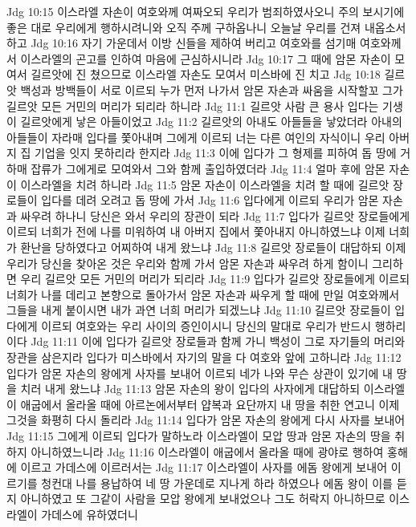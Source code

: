 Jdg 10:15  이스라엘 자손이 여호와께 여짜오되 우리가 범죄하였사오니 주의 보시기에 좋은 대로 우리에게 행하시려니와 오직 주께 구하옵나니 오늘날 우리를 건져 내옵소서 하고
Jdg 10:16  자기 가운데서 이방 신들을 제하여 버리고 여호와를 섬기매 여호와께서 이스라엘의 곤고를 인하여 마음에 근심하시니라
Jdg 10:17  그 때에 암몬 자손이 모여서 길르앗에 진 쳤으므로 이스라엘 자손도 모여서 미스바에 진 치고
Jdg 10:18  길르앗 백성과 방백들이 서로 이르되 누가 먼저 나가서 암몬 자손과 싸움을 시작할꼬 그가 길르앗 모든 거민의 머리가 되리라 하니라
Jdg 11:1  길르앗 사람 큰 용사 입다는 기생이 길르앗에게 낳은 아들이었고
Jdg 11:2  길르앗의 아내도 아들들을 낳았더라 아내의 아들들이 자라매 입다를 쫓아내며 그에게 이르되 너는 다른 여인의 자식이니 우리 아버지 집 기업을 잇지 못하리라 한지라
Jdg 11:3  이에 입다가 그 형제를 피하여 돕 땅에 거하매 잡류가 그에게로 모여와서 그와 함께 출입하였더라
Jdg 11:4  얼마 후에 암몬 자손이 이스라엘을 치려 하니라
Jdg 11:5  암몬 자손이 이스라엘을 치려 할 때에 길르앗 장로들이 입다를 데려 오려고 돕 땅에 가서
Jdg 11:6  입다에게 이르되 우리가 암몬 자손과 싸우려 하나니 당신은 와서 우리의 장관이 되라
Jdg 11:7  입다가 길르앗 장로들에게 이르되 너희가 전에 나를 미워하여 내 아버지 집에서 쫓아내지 아니하였느냐 이제 너희가 환난을 당하였다고 어찌하여 내게 왔느냐
Jdg 11:8  길르앗 장로들이 대답하되 이제 우리가 당신을 찾아온 것은 우리와 함께 가서 암몬 자손과 싸우려 하게 함이니 그리하면 우리 길르앗 모든 거민의 머리가 되리라
Jdg 11:9  입다가 길르앗 장로들에게 이르되 너희가 나를 데리고 본향으로 돌아가서 암몬 자손과 싸우게 할 때에 만일 여호와께서 그들을 내게 붙이시면 내가 과연 너희 머리가 되겠느냐
Jdg 11:10  길르앗 장로들이 입다에게 이르되 여호와는 우리 사이의 증인이시니 당신의 말대로 우리가 반드시 행하리이다
Jdg 11:11  이에 입다가 길르앗 장로들과 함께 가니 백성이 그로 자기들의 머리와 장관을 삼은지라 입다가 미스바에서 자기의 말을 다 여호와 앞에 고하니라
Jdg 11:12  입다가 암몬 자손의 왕에게 사자를 보내어 이르되 네가 나와 무슨 상관이 있기에 내 땅을 치러 내게 왔느냐
Jdg 11:13  암몬 자손의 왕이 입다의 사자에게 대답하되 이스라엘이 애굽에서 올라올 때에 아르논에서부터 얍복과 요단까지 내 땅을 취한 연고니 이제 그것을 화평히 다시 돌리라
Jdg 11:14  입다가 암몬 자손의 왕에게 다시 사자를 보내어
Jdg 11:15  그에게 이르되 입다가 말하노라 이스라엘이 모압 땅과 암몬 자손의 땅을 취하지 아니하였느니라
Jdg 11:16  이스라엘이 애굽에서 올라올 때에 광야로 행하여 홍해에 이르고 가데스에 이르러서는
Jdg 11:17  이스라엘이 사자를 에돔 왕에게 보내어 이르기를 청컨대 나를 용납하여 네 땅 가운데로 지나게 하라 하였으나 에돔 왕이 이를 듣지 아니하였고 또 그같이 사람을 모압 왕에게 보내었으나 그도 허락지 아니하므로 이스라엘이 가데스에 유하였더니
